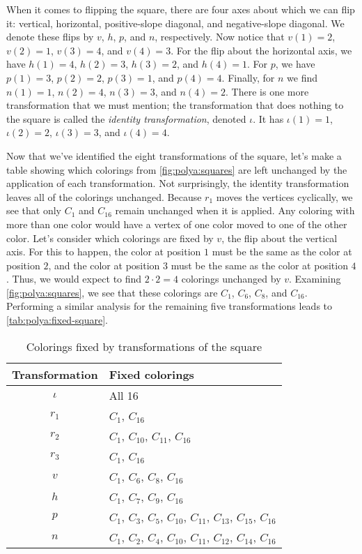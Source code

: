 When it comes to flipping the square, there are four axes about which
we can flip it: vertical, horizontal, positive-slope diagonal, and
negative-slope diagonal. We denote these flips by $v$, $h$, $p$, and
$n$, respectively. Now notice that $v(1) = 2$, $v(2) = 1$, $v(3) = 4$,
and $v(4) = 3$. For the flip about the horizontal axis, we have $h(1)
= 4$, $h(2) = 3$, $h(3)=2$, and $h(4)= 1$. For $p$, we have $p(1) =
3$, $p(2) = 2$, $p(3)=1$, and $p(4)=4$. Finally, for $n$ we find $n(1)
= 1$, $n(2) = 4$, $n(3) = 3$, and $n(4)=2$. There is one more
transformation that we must mention; the transformation that does
nothing to the square is called the \emph{identity transformation},
denoted $\iota$. It has $\iota(1)=1$, $\iota(2)=2$, $\iota(3)=3$, and
$\iota(4)=4$.

Now that we've identified the eight transformations of the square,
let's make a table showing which colorings from
\autoref{fig:polya:squares} are left unchanged by the application of
each transformation. Not surprisingly, the identity transformation
leaves all of the colorings unchanged. Because $r_1$ moves the
vertices cyclically, we see that only $C_1$ and $C_{16}$ remain
unchanged when it is applied. Any coloring with more than one color
would have a vertex of one color moved to one of the other
color. Let's consider which colorings are fixed by $v$, the flip about
the vertical axis. For this to happen, the color at position $1$ must
be the same as the color at position $2$, and the color at position
$3$ must be the same as the color at position $4$. Thus, we would
expect to find $2\cdot 2 = 4$ colorings unchanged by $v$. Examining
\autoref{fig:polya:squares}, we see that these colorings are $C_1$,
$C_6$, $C_8$, and $C_{16}$. Performing a similar analysis for the
remaining five transformations leads to
\autoref{tab:polya:fixed-square}.

\begin{table}[b]
  \centering
  \begin{tabular}{c|l}
    Transformation & Fixed colorings\\\hline
    $\iota$ & All 16\\
    $r_1$ & $C_1$, $C_{16}$\\
    $r_2$ & $C_{1}$, $C_{10}$, $C_{11}$, $C_{16}$\\
    $r_3$ & $C_1$, $C_{16}$\\
    $v$ & $C_1$, $C_6$, $C_8$, $C_{16}$\\
    $h$ & $C_1$, $C_7$, $C_{9}$, $C_{16}$\\
    $p$ & $C_1$, $C_3$, $C_5$, $C_{10}$, $C_{11}$, $C_{13}$, $C_{15}$,
    $C_{16}$\\
    $n$ & $C_1$, $C_2$, $C_4$, $C_{10}$, $C_{11}$, $C_{12}$, $C_{14}$,
    $C_{16}$\\
  \end{tabular}
  \caption{Colorings fixed by transformations of the square}
  \label{tab:polya:fixed-square}
\end{table}

